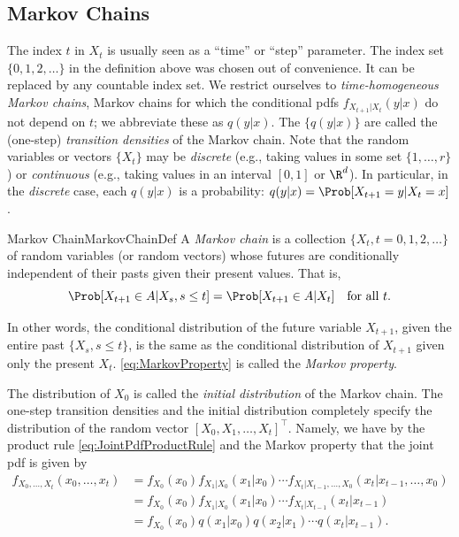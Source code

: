 \subsection{Markov Chains}
The index \(t\) in \(X_t\) is usually seen as a ``time'' or ``step'' parameter. The index set \(\{0, 1, 2, \dots\}\) in the definition above was chosen out of convenience. It can be replaced by any countable index set. We restrict ourselves to \textit{time-homogeneous Markov chains}, Markov chains for which the conditional pdfs \(f_{X_{t+1}|X_t}(y|x)\) do not depend on \(t\); we abbreviate these as \(q(y|x)\). The \(\{q(y|x)\}\) are called the (one-step) \textit{transition densities} of the Markov chain. Note that the random variables or vectors \(\{X_t\}\) may be \textit{discrete} (e.g., taking values in some set \(\{1, \dots, r\}\)) or \textit{continuous} (e.g., taking values in an interval \([0, 1]\) or \(\R^d\)). In particular, in the \textit{discrete} case, each \(q(y|x)\) is a probability: \(q(y|x) = \Prob[X_{t+1} = y | X_t = x]\).

\begin{defn}{Markov Chain}{MarkovChainDef}
	A \textit{Markov chain} is a collection \(\{X_t, t = 0, 1, 2, \dots\}\) of random variables (or random vectors) whose futures are conditionally independent of their pasts given their present values. That is,
	\begin{equation} \label{eq:MarkovProperty}
		\Prob[X_{t+1} \in A | X_s, s \le t] = \Prob[X_{t+1} \in A | X_t] \quad \text{for all } t.
	\end{equation}
\end{defn}
In other words, the conditional distribution of the future variable \(X_{t+1}\), given the entire past \(\{X_s, s \le t\}\), is the same as the conditional distribution of \(X_{t+1}\) given only the present \(X_t\). \cref{eq:MarkovProperty} is called the \textit{Markov property}.

The distribution of \(X_0\) is called the \textit{initial distribution} of the Markov chain. The one-step transition densities and the initial distribution completely specify the distribution of the random vector \([X_0, X_1, \dots, X_t]^\top\). Namely, we have by the product rule \cref{eq:JointPdfProductRule} and the Markov property that the joint pdf is given by
\begin{align*}
	f_{X_0, \dots, X_t}(x_0, \dots, x_t) & = f_{X_0}(x_0) f_{X_1|X_0}(x_1|x_0) \cdots f_{X_t|X_{t-1}, \dots, X_0}(x_t | x_{t-1}, \dots, x_0) \\
	                                     & = f_{X_0}(x_0) f_{X_1|X_0}(x_1|x_0) \cdots f_{X_t|X_{t-1}}(x_t | x_{t-1})                         \\
	                                     & = f_{X_0}(x_0) q(x_1|x_0) q(x_2|x_1) \cdots q(x_t|x_{t-1}).
\end{align*}

